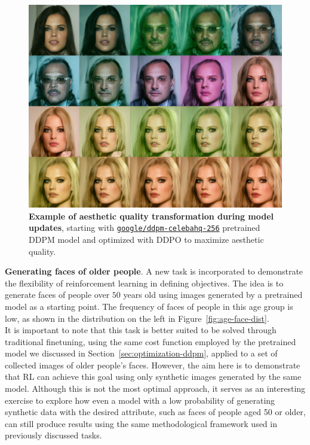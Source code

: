 \begin{figure}[ht]
  \centering
  \includegraphics[scale=1.40]{img/results/laion_60.png}
  \vspace{-0pt}  %
    \captionsetup{width=\textwidth} %
    \caption{\textbf{Example of aesthetic quality transformation during model updates}, starting with \href{https://huggingface.co/google/ddpm-celebahq-256}{\texttt{\texttt{google/ddpm-celebahq-256}}} pretrained DDPM model and optimized with DDPO to maximize aesthetic quality.}
    \label{fig:ddpm-to-ddpo-aesthetic}
\end{figure}

\noindent \textbf{Generating faces of older people}. A new task is incorporated
to demonstrate the flexibility of reinforcement learning in defining objectives. The idea is to generate faces of people over $50$ years old using images generated by a pretrained model as a starting point. The frequency
of faces of people in this age group is low, as shown in the distribution on
the left in Figure~\ref{fig:age-face-dist}. \\

\noindent It is important to note that this task is better suited to be
solved through traditional finetuning, using the same cost function employed
by the pretrained model we discussed in Section~\ref{sec:optimization-ddpm},
applied to a set of collected images of older people's faces. However, the
aim here is to demonstrate that RL can achieve this goal using only synthetic
images generated by the same model. Although this is not the most optimal 
approach, it serves as an interesting exercise to explore how even a model with a low probability of generating synthetic data with the desired attribute, such as faces of people aged 50 or older, can still produce results using the same methodological framework used in previously discussed tasks. \\

